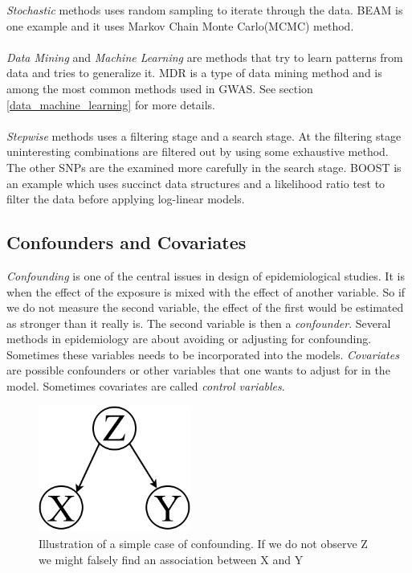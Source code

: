 \documentclass[10pt,a4paper]{report}
\newcounter{example}
\begin{document}
\emph{Stochastic} methods uses random sampling to iterate through the data. BEAM\cite{beam_2007} is one example and it uses Markov Chain Monte Carlo(MCMC) method.\\
\\
\emph{Data Mining} and \emph{Machine Learning} are methods that try to learn patterns from data and tries to generalize it. MDR\cite{mdr_2001} is a type of data mining method and is among the most common methods used in GWAS. See section \ref{data_machine_learning} for more details.\\
\\
\emph{Stepwise} methods uses a filtering stage and a search stage. At the filtering stage uninteresting combinations are filtered out by using some exhaustive method. The other SNPs are the examined more carefully in the search stage. BOOST\cite{boost_gene_gene} is an example which uses succinct data structures and a likelihood ratio test to filter the data before applying log-linear models.

\subsection{Confounders and Covariates}
\emph{Confounding} is one of the central issues in design of epidemiological studies. It is when the effect of the exposure is mixed with the effect of another variable. So if we do not measure the second variable, the effect of the first would be estimated as stronger than it really is. The second variable is then a \emph{confounder}. Several methods in epidemiology are about avoiding or adjusting for confounding. Sometimes these variables needs to be incorporated into the models. \emph{Covariates} are possible confounders or other variables that one wants to adjust for in the model. Sometimes covariates are called \emph{control variables}.\cite{rothman2002intro_epidemiology,rothman1998modern}

\begin{figure}[h]
    \centering
    \includegraphics[width=5cm]{Simple_Confounding_Case.png}
    \caption{Illustration of a simple case of confounding. If we do not observe Z we might falsely find an association between X and Y}
    \label{fig:confunding}
\end{figure}
\end{document}
